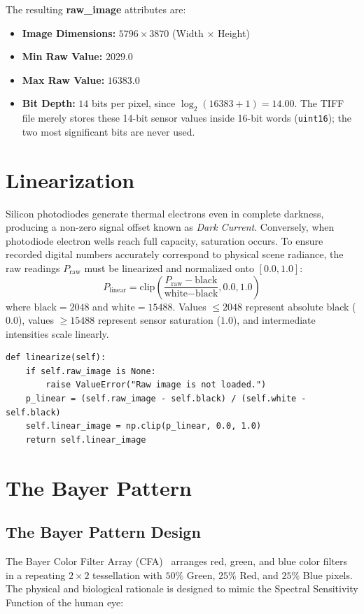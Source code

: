 \documentclass[a4paper]{article}
\begin{document}
The resulting \textbf{raw\_image} attributes are:
\begin{itemize}
    \item \textbf{Image Dimensions:} $5796 \times 3870$ (Width $\times$ Height)
    \item \textbf{Min Raw Value:} $2029.0$
    \item \textbf{Max Raw Value:} $16383.0$
    \item \textbf{Bit Depth:} $14$ bits per pixel, since $\log_2(16383 + 1) = 14.00$. The TIFF file merely stores these 14-bit sensor values inside 16-bit words (\texttt{uint16}); the two most significant bits are never used.
\end{itemize}

\section{Linearization}
Silicon photodiodes generate thermal electrons even in complete darkness, producing a non-zero signal offset known as \textit{Dark Current}. Conversely, when photodiode electron wells reach full capacity, saturation occurs. To ensure recorded digital numbers accurately correspond to physical scene radiance, the raw readings $P_{\text{raw}}$ must be linearized and normalized onto $[0.0, 1.0]$:
\begin{equation}
    P_{\text{linear}} = \text{clip}\left(\frac{P_{\text{raw}} - \text{black}}{\text{white} - \text{black}}, 0.0, 1.0\right)
\end{equation}
where $\text{black} = 2048$ and $\text{white} = 15488$. Values $\le 2048$ represent absolute black ($0.0$), values $\ge 15488$ represent sensor saturation ($1.0$), and intermediate intensities scale linearly.

\begin{lstlisting}
def linearize(self):
    if self.raw_image is None:
        raise ValueError("Raw image is not loaded.")
    p_linear = (self.raw_image - self.black) / (self.white - self.black)
    self.linear_image = np.clip(p_linear, 0.0, 1.0)
    return self.linear_image
\end{lstlisting}

\section{The Bayer Pattern}

\subsection{The Bayer Pattern Design}
The Bayer Color Filter Array (CFA)~\cite{bayer1976} arranges red, green, and blue color filters in a repeating $2 \times 2$ tessellation with $50\%$ Green, $25\%$ Red, and $25\%$ Blue pixels. The physical and biological rationale is designed to mimic the Spectral Sensitivity Function of the human eye:
\end{document}
